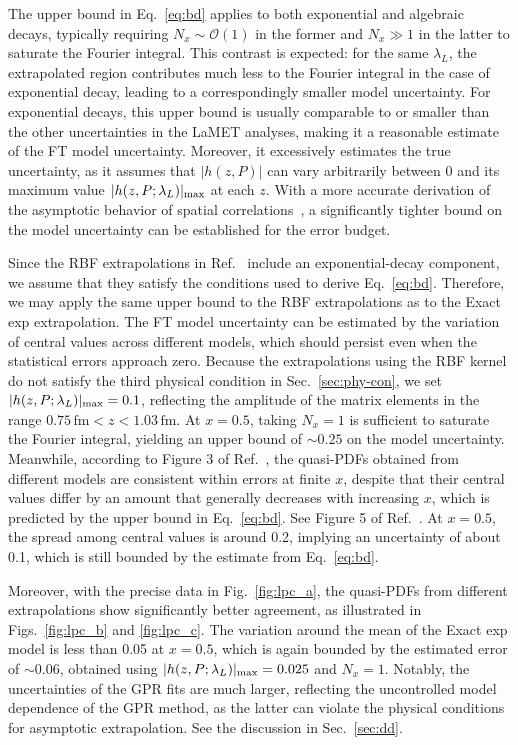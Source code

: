 \documentclass[prd,twocolumn,superscriptaddress,preprintnumbers,showpacs,nofootinbib,notitlepage,floatfix]{revtex4-2}
\DeclareRobustCommand{\eq}[1]{Eq.~\eqref{eq:#1}}
\DeclareRobustCommand{\fig}[1]{Fig.~\ref{fig:#1}}
\DeclareRobustCommand{\figs}[2]{Figs.~\ref{fig:#1} and \ref{fig:#2}}
\DeclareRobustCommand{\sec}[1]{Sec.~\ref{sec:#1}}
\DeclareRobustCommand{\eq}[1]{Eq.~(\ref{eq:#1})}
\begin{document}
The upper bound in \eq{bd} applies to both exponential and algebraic decays, typically requiring $N_x \sim \mathcal{O}(1)$ in the former and $N_x \gg 1$ in the latter to saturate the Fourier integral. This contrast is expected: for the same $\lambda_L$, the extrapolated region contributes much less to the Fourier integral in the case of exponential decay, leading to a correspondingly smaller model uncertainty. For exponential decays, this upper bound is usually comparable to or smaller than the other uncertainties in the LaMET analyses,  making it a reasonable estimate of the FT model uncertainty. Moreover, it excessively estimates the true uncertainty, as it assumes that $|h(z, P)|$ can vary arbitrarily between 0 and its maximum value $|h(z, P; \lambda_L)|_{\rm max}$ at each $z$. With a more accurate derivation of the asymptotic behavior of spatial correlations~\cite{Ji:2026vir}, a significantly tighter bound on the model uncertainty can be established for the error budget.

Since the RBF extrapolations in Ref.~\cite{Dutrieux:2025jed} include an exponential-decay component, we assume that they satisfy the conditions used to derive \eq{bd}. Therefore, we may apply the same upper bound to the RBF extrapolations as to the Exact exp extrapolation. The FT model uncertainty can be estimated by the variation of central values across different models, which should persist even when the statistical errors approach zero. Because the extrapolations using the RBF kernel do not satisfy the third physical condition in \sec{phy-con}, we set $|h(z,P;\lambda_L)|_{\rm max} = 0.1$, reflecting the amplitude of the matrix elements in the range $0.75\,\text{fm} < z < 1.03\,\text{fm}$. At $x = 0.5$, taking $N_x = 1$ is sufficient to saturate the Fourier integral, yielding an upper bound of $\sim 0.25$ on the model uncertainty. Meanwhile, according to Figure 3 of Ref.~\cite{Dutrieux:2025jed}, the quasi-PDFs obtained from different models are consistent within errors at finite $x$, despite that their central values differ by an amount that generally decreases with increasing $x$, which is predicted by the upper bound in \eq{bd}. See Figure 5 of Ref.~\cite{Dutrieux:2025jed}. At $x = 0.5$, the spread among central values is around 0.2, implying an uncertainty of about 0.1, which is still bounded by the estimate from \eq{bd}.

Moreover, with the precise data in \fig{lpc_a}, the quasi-PDFs from different extrapolations show significantly better agreement, as illustrated in \figs{lpc_b}{lpc_c}. The variation around the mean of the Exact exp model is less than 0.05 at $x = 0.5$, which is again bounded by the estimated error of $\sim 0.06$, obtained using $|h(z,P;\lambda_L)|_{\rm max} = 0.025$ and $N_x = 1$. Notably, the uncertainties of the GPR fits are much larger, reflecting the uncontrolled model dependence of the GPR method, as the latter can violate the physical conditions for asymptotic extrapolation. See the discussion in \sec{dd}.
\end{document}
